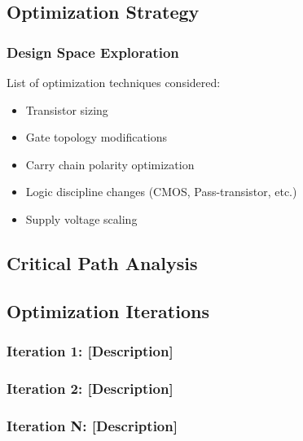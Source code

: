 \documentclass[12pt,letterpaper]{article}
\begin{document}

\subsection{Optimization Strategy}

\subsubsection{Design Space Exploration}

List of optimization techniques considered:
\begin{itemize}
    \item Transistor sizing
    \item Gate topology modifications
    \item Carry chain polarity optimization
    \item Logic discipline changes (CMOS, Pass-transistor, etc.)
    \item Supply voltage scaling
\end{itemize}

\subsection{Critical Path Analysis}


\subsection{Optimization Iterations}

\subsubsection{Iteration 1: [Description]}


\subsubsection{Iteration 2: [Description]}

\subsubsection{Iteration N: [Description]}
\end{document}
